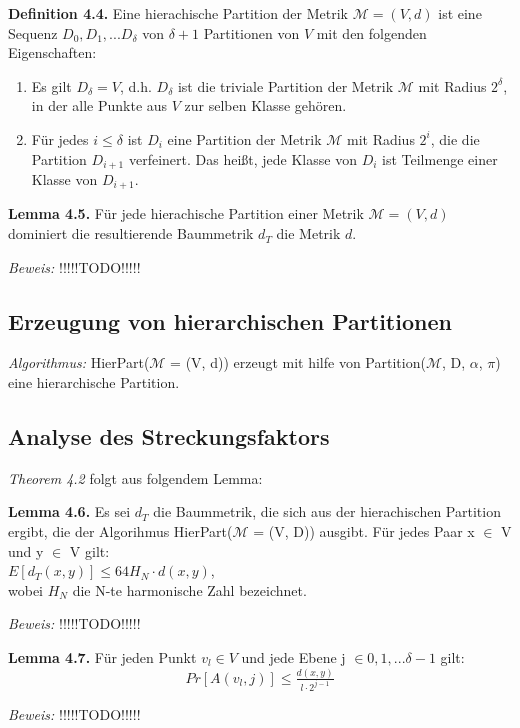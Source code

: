 \textbf{Definition 4.4.} Eine hierachische Partition der Metrik $\mathcal{M} = (V, d)$ ist eine Sequenz $D_{0}, D_{1}, ... D_{\delta}$ von $\delta + 1$ Partitionen von $V$ mit den folgenden Eigenschaften:
\begin{enumerate}
\item Es gilt $D_{\delta} = {V}$, d.h. $D_{\delta}$ ist die triviale Partition der Metrik $\mathcal{M}$ mit Radius $2^{\delta}$, in der alle Punkte aus $V$ zur selben Klasse gehören.
\item Für jedes $i \le \delta$ ist $D_{i}$ eine Partition der Metrik $\mathcal{M}$ mit Radius $2^{i}$, die die Partition $D_{i+1}$ verfeinert. Das heißt, jede Klasse von $D_{i}$ ist Teilmenge einer Klasse von $D_{i+1}$.
\end{enumerate}

\textbf{Lemma 4.5.} Für jede hierachische Partition einer Metrik $\mathcal{M} = (V, d)$ dominiert die resultierende Baummetrik $d_{T}$ die Metrik $d$.

\textit{Beweis:} !!!!!TODO!!!!!

\subsection{Erzeugung von hierarchischen Partitionen}

\textit{Algorithmus:} HierPart($\mathcal{M}$ = (V, d)) erzeugt mit hilfe von Partition($\mathcal{M}$, D, $\alpha$, $\pi$) eine hierarchische Partition.

\subsection{Analyse des Streckungsfaktors}

\textit{Theorem 4.2} folgt aus folgendem Lemma:

\textbf{Lemma 4.6.} Es sei $d_{T}$ die Baummetrik, die sich aus der hierachischen Partition ergibt, die der Algorihmus HierPart($\mathcal{M}$ = (V, D)) ausgibt. Für jedes Paar x $\in$ V und y $\in$ V gilt:\\
$E[d_{T}(x, y)] \le 64 H_{N} \cdot d(x, y)$, \\
wobei $H_{N}$ die N-te harmonische Zahl bezeichnet.

\textit{Beweis:} !!!!!TODO!!!!!

\textbf{Lemma 4.7.} Für jeden Punkt $v_{l} \in V$ und jede Ebene j $\in {0, 1, ... \delta -1}$ gilt: $$Pr[A(v_{l}, j)] \le \tfrac{d(x, y)}{l \cdot 2^{j-1}}$$

\textit{Beweis:} !!!!!TODO!!!!!

